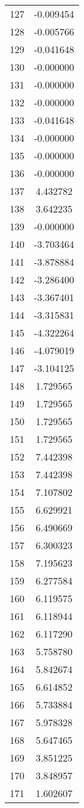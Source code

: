 \documentclass[12pt]{article}
\begin{document}
\begin{longtable}{@{}cc@{}}
127 & -0.009454 \\
128 & -0.005766 \\
129 & -0.041648 \\
130 & -0.000000 \\
131 & -0.000000 \\
132 & -0.000000 \\
133 & -0.041648 \\
134 & -0.000000 \\
135 & -0.000000 \\
136 & -0.000000 \\
137 & 4.432782 \\
138 & 3.642235 \\
139 & -0.000000 \\
140 & -3.703464 \\
141 & -3.878884 \\
142 & -3.286400 \\
143 & -3.367401 \\
144 & -3.315831 \\
145 & -4.322264 \\
146 & -4.079019 \\
147 & -3.104125 \\
148 & 1.729565 \\
149 & 1.729565 \\
150 & 1.729565 \\
151 & 1.729565 \\
152 & 7.442398 \\
153 & 7.442398 \\
154 & 7.107802 \\
155 & 6.629921 \\
156 & 6.490669 \\
157 & 6.300323 \\
158 & 7.195623 \\
159 & 6.277584 \\
160 & 6.119575 \\
161 & 6.118944 \\
162 & 6.117290 \\
163 & 5.758780 \\
164 & 5.842674 \\
165 & 6.614852 \\
166 & 5.733884 \\
167 & 5.978328 \\
168 & 5.647465 \\
169 & 3.851225 \\
170 & 3.848957 \\
171 & 1.602607 \\

\end{longtable}
\end{document}
